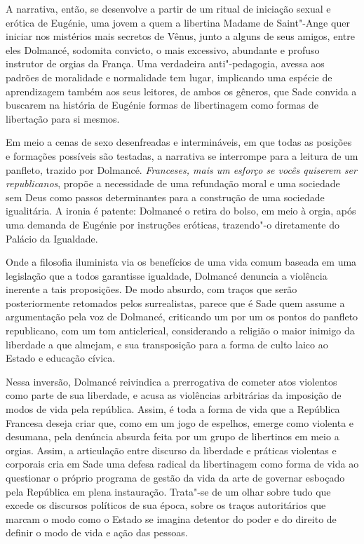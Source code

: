A narrativa, então, se desenvolve a partir de um ritual de iniciação
sexual e erótica de Eugénie, uma jovem a quem a libertina Madame de
Saint"-Ange quer iniciar nos mistérios mais secretos de Vênus, junto a
alguns de seus amigos, entre eles Dolmancé, sodomita convicto, o mais
excessivo, abundante e profuso instrutor de orgias da França. Uma
verdadeira anti"-pedagogia, avessa aos padrões de moralidade e
normalidade tem lugar, implicando uma espécie de aprendizagem também aos
seus leitores, de ambos os gêneros, que Sade convida a buscarem na
história de Eugénie formas de libertinagem como formas de libertação
para si mesmos.

Em meio a cenas de sexo desenfreadas e intermináveis, em que todas as
posições e formações possíveis são testadas, a narrativa se interrompe
para a leitura de um panfleto, trazido por Dolmancé. \emph{Franceses,
mais um esforço se vocês quiserem ser republicanos}, propõe a
necessidade de uma refundação moral e uma sociedade sem Deus como passos
determinantes para a construção de uma sociedade igualitária. A ironia é
patente: Dolmancé o retira do bolso, em meio à orgia, após uma demanda
de Eugénie por instruções eróticas, trazendo"-o diretamente do Palácio da
Igualdade.

Onde a filosofia iluminista via os benefícios de uma vida comum baseada
em uma legislação que a todos garantisse igualdade, Dolmancé denuncia a
violência inerente a tais proposições. De modo absurdo, com traços que
serão posteriormente retomados pelos surrealistas, parece que é Sade
quem assume a argumentação pela voz de Dolmancé, criticando um por um os
pontos do panfleto republicano, com um tom anticlerical, considerando a
religião o maior inimigo da liberdade a que almejam, e sua transposição
para a forma de culto laico ao Estado e educação cívica.

Nessa inversão, Dolmancé reivindica a prerrogativa de cometer atos
violentos como parte de sua liberdade, e acusa as violências arbitrárias
da imposição de modos de vida pela república. Assim, é toda a forma de
vida que a República Francesa deseja criar que, como em um jogo de
espelhos, emerge como violenta e desumana, pela denúncia absurda feita
por um grupo de libertinos em meio a orgias. Assim, a articulação entre
discurso da liberdade e práticas violentas e corporais cria em Sade uma
defesa radical da libertinagem como forma de vida ao questionar o
próprio programa de gestão da vida da arte de governar esboçado pela
República em plena instauração. Trata"-se de um olhar sobre tudo que
excede os discursos políticos de sua época, sobre os traços autoritários
que marcam o modo como o Estado se imagina detentor do poder e do
direito de definir o modo de vida e ação das pessoas.


